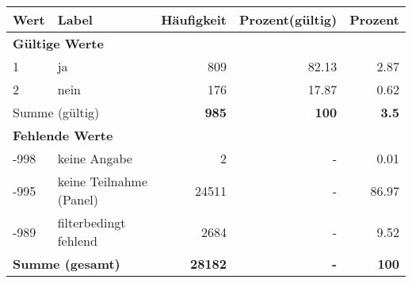      \begin{longtable}{lXrrr}
     \toprule
     \textbf{Wert} & \textbf{Label} & \textbf{Häufigkeit} & \textbf{Prozent(gültig)} & \textbf{Prozent} \\
     \endhead
     \midrule
     \multicolumn{5}{l}{\textbf{Gültige Werte}}\\

     1 &
     \multicolumn{1}{X}{ ja   } &


       \num{809} &
       \num[round-mode=places,round-precision=2]{82,13} &
         \num[round-mode=places,round-precision=2]{2,87} \\

     2 &
     \multicolumn{1}{X}{ nein   } &


       \num{176} &
       \num[round-mode=places,round-precision=2]{17,87} &
         \num[round-mode=places,round-precision=2]{0,62} \\
     \midrule
     \multicolumn{2}{l}{Summe (gültig)} &
       \textbf{\num{985}} &
     \textbf{100} &
       \textbf{\num[round-mode=places,round-precision=2]{3,5}} \\
     \multicolumn{5}{l}{\textbf{Fehlende Werte}}\\
       -998 &
       keine Angabe &
         \num{2} &
        - &
         \num[round-mode=places,round-precision=2]{0,01} \\
       -995 &
       keine Teilnahme (Panel) &
         \num{24511} &
        - &
         \num[round-mode=places,round-precision=2]{86,97} \\
       -989 &
       filterbedingt fehlend &
         \num{2684} &
        - &
         \num[round-mode=places,round-precision=2]{9,52} \\
     \midrule
     \multicolumn{2}{l}{\textbf{Summe (gesamt)}} &
          \textbf{\num{28182}} &
        \textbf{-} &
        \textbf{100} \\
     \bottomrule
     \end{longtable}
     
